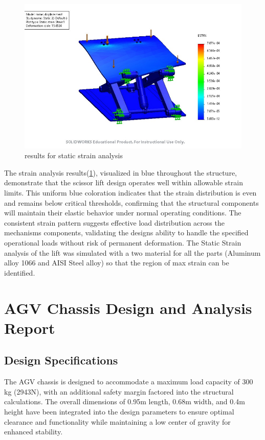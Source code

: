 \documentclass[../../main]{subfiles}
\begin{document}
\begin{figure}[h!]
  \centering
  \includegraphics[width=\textwidth]{img/image107.jpg}
  \caption{results for static strain analysis}
  \label{bmfig16}
  \end{figure}
  

The strain analysis results(\cref{bmfig16}), visualized in blue throughout the
structure, demonstrate that the scissor lift design operates well within
allowable strain limits. This uniform blue coloration indicates that the
strain distribution is even and remains below critical thresholds,
confirming that the structural components will maintain their elastic
behavior under normal operating conditions. The consistent strain
pattern suggests effective load distribution across the
mechanism\textquotesingle s components, validating the
design\textquotesingle s ability to handle the specified operational
loads without risk of permanent deformation. The Static Strain analysis
of the lift was simulated with a two material for all the parts
(Aluminum alloy 1066 and AISI Steel alloy) so that the region of max
strain can be identified.

\section{AGV Chassis Design and Analysis
Report}\label{agv-chassis-design-and-analysis-report}

\subsection{Design Specifications}\label{design-specifications}

The AGV chassis is designed to accommodate a maximum load capacity of
300 kg (2943N), with an additional safety margin factored into the
structural calculations. The overall dimensions of 0.95m length, 0.68m
width, and 0.4m height have been integrated into the design parameters
to ensure optimal clearance and functionality while maintaining a low
center of gravity for enhanced stability.
\end{document}
